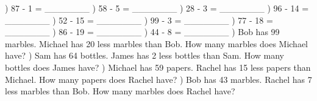 \documentclass{article}%
\begin{document}
) 87 {-} 1 = \_\_\_\_\_\_\_%
\newline%
\newline%
) 58 {-} 5 = \_\_\_\_\_\_\_%
\newline%
\newline%
) 28 {-} 3 = \_\_\_\_\_\_\_%
\newline%
\newline%
) 96 {-} 14 = \_\_\_\_\_\_\_%
\newline%
\newline%
) 52 {-} 15 = \_\_\_\_\_\_\_%
\newline%
\newline%
) 99 {-} 3 = \_\_\_\_\_\_\_%
\newline%
\newline%
) 77 {-} 18 = \_\_\_\_\_\_\_%
\newline%
\newline%
) 86 {-} 19 = \_\_\_\_\_\_\_%
\newline%
\newline%
) 44 {-} 8 = \_\_\_\_\_\_\_%
\newline%
\newline%
) Bob has 99 marbles. Michael has 20 less marbles than Bob. How many marbles does Michael have?%
\newline%
\newline%
) Sam has 64 bottles. James has 2 less bottles than Sam. How many bottles does James have?%
\newline%
\newline%
) Michael has 59 papers. Rachel has 15 less papers than Michael. How many papers does Rachel have?%
\newline%
\newline%
) Bob has 43 marbles. Rachel has 7 less marbles than Bob. How many marbles does Rachel have?%
\newline%
\newline%
\end{document}
